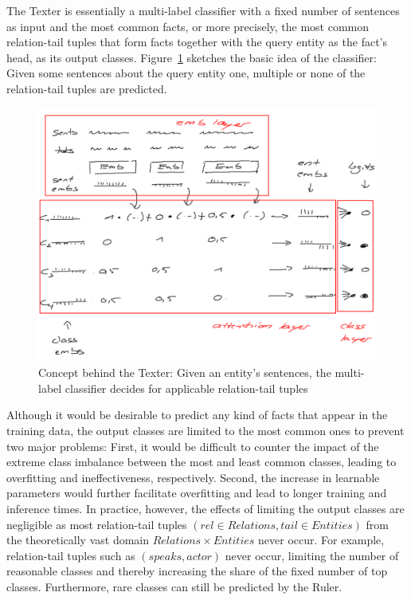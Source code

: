 The Texter is essentially a multi-label classifier with a fixed number of sentences as input and the most common facts, or more precisely, the most common relation-tail tuples that form facts together with the query entity as the fact's head, as its output classes. Figure~\ref{fig:4_approach/1_texter/2_attention_model/texter_architecture} sketches the basic idea of the classifier: Given some sentences about the query entity one, multiple or none of the relation-tail tuples are predicted.

\begin{figure}
    \centering
    \includegraphics[width=\textwidth]{4_approach/1_texter/2_attention_model/texter_architecture}
    \caption{Concept behind the Texter: Given an entity's sentences, the multi-label classifier decides for applicable relation-tail tuples}
    \label{fig:4_approach/1_texter/2_attention_model/texter_architecture}
\end{figure}

Although it would be desirable to predict any kind of facts that appear in the training data, the output classes are limited to the most common ones to prevent two major problems: First, it would be difficult to counter the impact of the extreme class imbalance between the most and least common classes, leading to overfitting and ineffectiveness, respectively. Second, the increase in learnable parameters would further facilitate overfitting and lead to longer training and inference times. In practice, however, the effects of limiting the output classes are negligible as most relation-tail tuples $(rel \in Relations, tail \in Entities)$ from the theoretically vast domain $Relations \times Entities$ never occur. For example, relation-tail tuples such as $(speaks, actor)$ never occur, limiting the number of reasonable classes and thereby increasing the share of the fixed number of top classes. Furthermore, rare classes can still be predicted by the Ruler.

